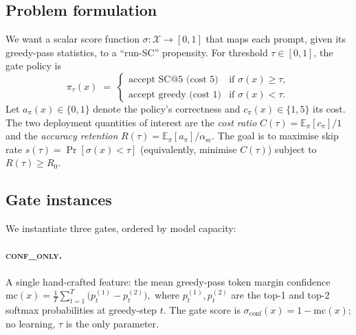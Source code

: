 \documentclass[11pt]{article}
\begin{document}
\subsection{Problem formulation}

We want a scalar score function
\(
\sigma : \mathcal{X} \to [0,1]
\)
that maps each prompt, given its greedy-pass statistics, to a
``run-SC'' propensity. For threshold $\tau\in[0,1]$, the
gate policy is
\begin{equation}
\pi_\tau(x) \;=\;
\begin{cases}
\text{accept SC@}5 \text{ (cost } 5\text{)} & \text{if } \sigma(x)\ge\tau,\\
\text{accept greedy (cost } 1\text{)} & \text{if } \sigma(x)<\tau.
\end{cases}
\label{eq:policy}
\end{equation}
Let $a_\pi(x)\in\{0,1\}$ denote the policy's correctness and
$c_\pi(x)\in\{1,5\}$ its cost. The two deployment quantities of
interest are the \emph{cost ratio} $C(\tau) =
\mathbb{E}_\pi[c_\pi]/1$ and the \emph{accuracy retention} $R(\tau)
= \mathbb{E}_\pi[a_\pi]/\alpha_\mathrm{sc}$. The goal is to
maximise skip rate $s(\tau)=\Pr[\sigma(x)<\tau]$ (equivalently,
minimise $C(\tau)$) subject to $R(\tau)\ge R_0$.

\subsection{Gate instances}

We instantiate three gates, ordered by model capacity:

\paragraph{\textsc{conf\_only}.}
A single hand-crafted feature: the mean greedy-pass token margin
confidence
\(
\mathrm{mc}(x) = \frac{1}{T}\sum_{t=1}^{T}
\big(p_t^{(1)} - p_t^{(2)}\big),
\)
where $p_t^{(1)},p_t^{(2)}$ are the top-1 and top-2 softmax
probabilities at greedy-step $t$. The gate score is
$\sigma_{\text{conf}}(x) = 1 - \mathrm{mc}(x)$; no learning, $\tau$
is the only parameter.
\end{document}
